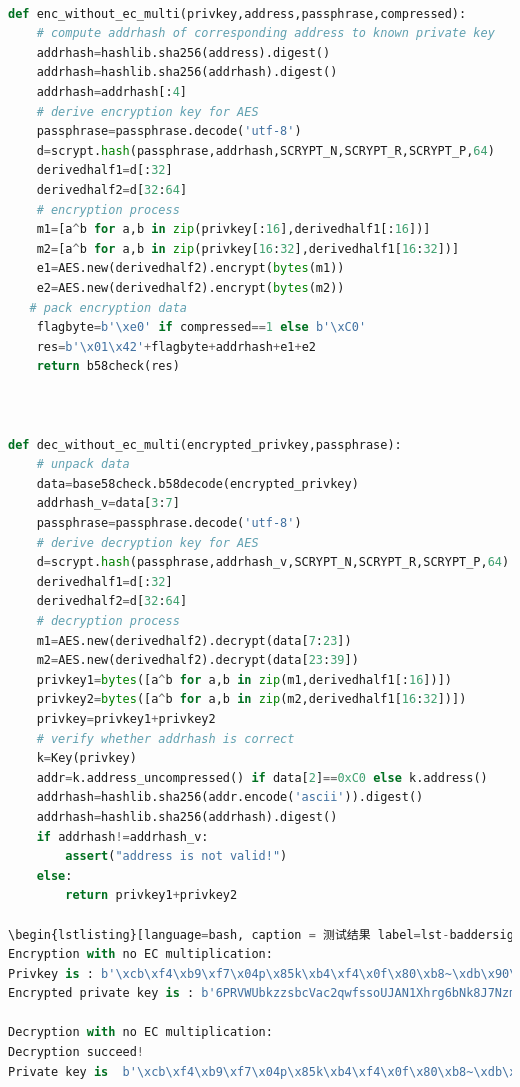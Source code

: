 \begin{lstlisting}[language=python, caption = Encryption \& Decryption with no EC multiplication label=lst-baddersig]

def enc_without_ec_multi(privkey,address,passphrase,compressed):
	# compute addrhash of corresponding address to known private key
	addrhash=hashlib.sha256(address).digest()
	addrhash=hashlib.sha256(addrhash).digest()
	addrhash=addrhash[:4]
	# derive encryption key for AES
	passphrase=passphrase.decode('utf-8')
	d=scrypt.hash(passphrase,addrhash,SCRYPT_N,SCRYPT_R,SCRYPT_P,64)
	derivedhalf1=d[:32]
	derivedhalf2=d[32:64]
	# encryption process
	m1=[a^b for a,b in zip(privkey[:16],derivedhalf1[:16])]
	m2=[a^b for a,b in zip(privkey[16:32],derivedhalf1[16:32])]
	e1=AES.new(derivedhalf2).encrypt(bytes(m1))
	e2=AES.new(derivedhalf2).encrypt(bytes(m2))
   # pack encryption data
	flagbyte=b'\xe0' if compressed==1 else b'\xC0'
	res=b'\x01\x42'+flagbyte+addrhash+e1+e2
	return b58check(res)



def dec_without_ec_multi(encrypted_privkey,passphrase):
	# unpack data 
	data=base58check.b58decode(encrypted_privkey)
	addrhash_v=data[3:7]
	passphrase=passphrase.decode('utf-8')
	# derive decryption key for AES
	d=scrypt.hash(passphrase,addrhash_v,SCRYPT_N,SCRYPT_R,SCRYPT_P,64)
	derivedhalf1=d[:32]
	derivedhalf2=d[32:64]
	# decryption process
	m1=AES.new(derivedhalf2).decrypt(data[7:23])
	m2=AES.new(derivedhalf2).decrypt(data[23:39])
	privkey1=bytes([a^b for a,b in zip(m1,derivedhalf1[:16])])
	privkey2=bytes([a^b for a,b in zip(m2,derivedhalf1[16:32])])
	privkey=privkey1+privkey2
	# verify whether addrhash is correct
	k=Key(privkey)
	addr=k.address_uncompressed() if data[2]==0xC0 else k.address()
	addrhash=hashlib.sha256(addr.encode('ascii')).digest()
	addrhash=hashlib.sha256(addrhash).digest()
	if addrhash!=addrhash_v:
		assert("address is not valid!")
	else:
		return privkey1+privkey2

\begin{lstlisting}[language=bash, caption = 测试结果 label=lst-baddersig]
Encryption with no EC multiplication:
Privkey is : b'\xcb\xf4\xb9\xf7\x04p\x85k\xb4\xf4\x0f\x80\xb8~\xdb\x90\x86Y\x97\xff\xeem\xf3\x15\xab\x16mq:\xf43\xa5'
Encrypted private key is : b'6PRVWUbkzzsbcVac2qwfssoUJAN1Xhrg6bNk8J7Nzm5H7kxEbn2Nh2ZoGg'

Decryption with no EC multiplication:
Decryption succeed!
Private key is  b'\xcb\xf4\xb9\xf7\x04p\x85k\xb4\xf4\x0f\x80\xb8~\xdb\x90\x86Y\x97\xff\xeem\xf3\x15\xab\x16mq:\xf43\xa5'
\end{lstlisting}

